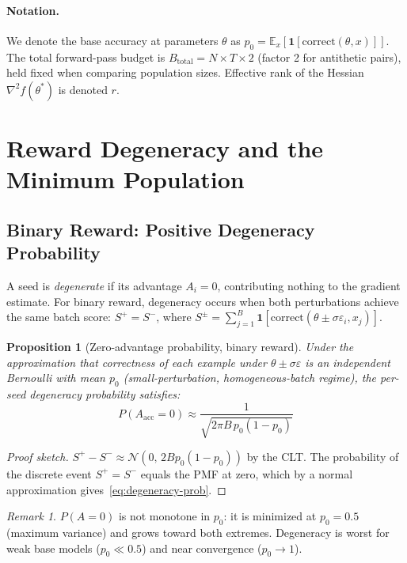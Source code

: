 \documentclass[11pt]{article}
\newtheorem{proposition}[theorem]{Proposition}
\theoremstyle{definition}
\theoremstyle{remark}
\newtheorem{remark}[theorem]{Remark}
\newcommand{\E}{\mathbb{E}}
\begin{document}
\paragraph{Notation.}
We denote the base accuracy at parameters $\theta$ as $p_0 = \E_x[\mathbf{1}[\text{correct}(\theta, x)]]$. The total forward-pass budget is $B_{\mathrm{total}} = N \times T \times 2$ (factor 2 for antithetic pairs), held fixed when comparing population sizes. Effective rank of the Hessian $\nabla^2 f(\theta^*)$ is denoted $r$.

\section{Reward Degeneracy and the Minimum Population}
\label{sec:degeneracy}

\subsection{Binary Reward: Positive Degeneracy Probability}
\label{sec:nmin}

A seed is \emph{degenerate} if its advantage $A_i = 0$, contributing nothing to the gradient estimate. For binary reward, degeneracy occurs when both perturbations achieve the same batch score: $S^+ = S^-$, where $S^\pm = \sum_{j=1}^B \mathbf{1}[\text{correct}(\theta \pm \sigma\varepsilon_i, x_j)]$.

\begin{proposition}[Zero-advantage probability, binary reward]
\label{prop:degeneracy}
Under the approximation that correctness of each example under $\theta \pm \sigma\varepsilon$ is an independent Bernoulli with mean $p_0$ (small-perturbation, homogeneous-batch regime), the per-seed degeneracy probability satisfies:
\begin{equation}
  \boxed{P(A_{\mathrm{acc}} = 0) \approx \frac{1}{\sqrt{2\pi B\, p_0(1-p_0)}}}
\label{eq:degeneracy-prob}
\end{equation}
\end{proposition}

\begin{proof}[Proof sketch]
$S^+ - S^- \approx \mathcal{N}(0,\, 2Bp_0(1-p_0))$ by the CLT. The probability of the discrete event $S^+=S^-$ equals the PMF at zero, which by a normal approximation gives~\eqref{eq:degeneracy-prob}.
\end{proof}

\begin{remark}
$P(A=0)$ is not monotone in $p_0$: it is minimized at $p_0 = 0.5$ (maximum variance) and grows toward both extremes. Degeneracy is worst for weak base models ($p_0 \ll 0.5$) and near convergence ($p_0 \to 1$).
\end{remark}
\end{document}
